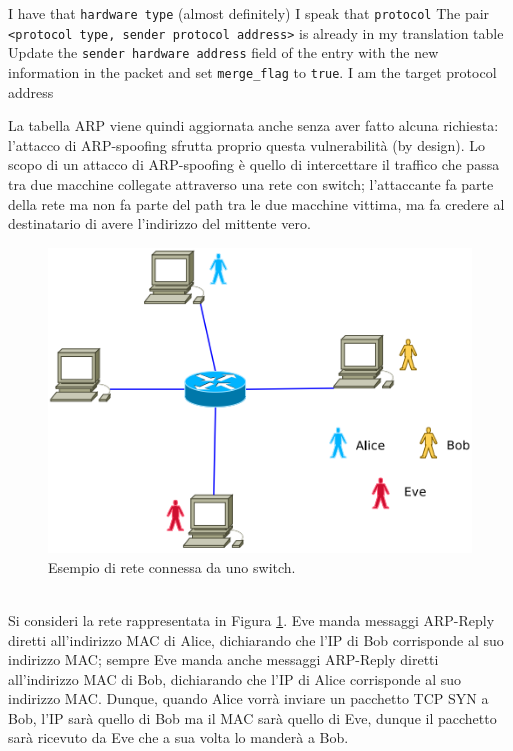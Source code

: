 \begin{codebox}
\li \If I have that \texttt{hardware type} (almost definitely)
\li \Then \If I speak that \texttt{protocol}
\li \Then \If The pair \texttt{<protocol type, sender protocol address>} is already in my translation table
\li \Then Update the \texttt{sender hardware address} field of the entry with the new information
\li in the packet and set \texttt{merge\_flag} to \texttt{true}.
\li \If I am the target protocol address
\li \Then [$\dots$] \End \End \End \End
\end{codebox}
La tabella ARP viene quindi aggiornata anche senza aver fatto alcuna richiesta: l'attacco di ARP-spoofing sfrutta proprio questa vulnerabilità (by design). Lo scopo di un attacco di ARP-spoofing è quello di intercettare il traffico che passa tra due macchine collegate attraverso una rete con switch; l'attaccante fa parte della rete ma non fa parte del path tra le due macchine vittima, ma fa credere al destinatario di avere l'indirizzo del mittente vero.
\begin{figure}[htbp]
	\centering
	\includegraphics[scale = 0.5]{images/ARP-spoofing}
	\caption{Esempio di rete connessa da uno switch.}
	\label{img:ARP-spoofing}
\end{figure}\\
Si consideri la rete rappresentata in Figura \ref{img:ARP-spoofing}. Eve manda messaggi ARP-Reply diretti all'indirizzo MAC di Alice, dichiarando che l'IP di Bob corrisponde al suo indirizzo MAC; sempre Eve manda anche messaggi ARP-Reply diretti all'indirizzo MAC di Bob, dichiarando che l'IP di Alice corrisponde al suo indirizzo MAC. Dunque, quando Alice vorrà inviare un pacchetto TCP SYN a Bob, l'IP sarà quello di Bob ma il MAC sarà quello di Eve, dunque il pacchetto sarà ricevuto da Eve che a sua volta lo manderà a Bob.\\
